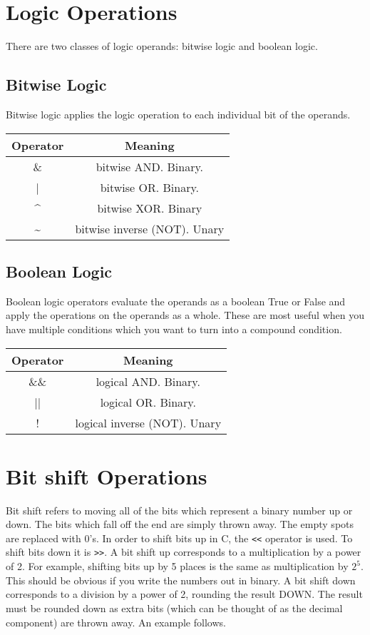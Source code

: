 \section{Logic Operations}
There are two classes of logic operands: bitwise logic and boolean logic. 
\subsection{Bitwise Logic}
Bitwise logic applies the logic operation to each individual bit of the operands. 
\begin{table}[h!]
\centering
\begin{tabu}{c c}
Operator & Meaning \\
\hline
\& & bitwise AND. Binary. \\
| & bitwise OR. Binary. \\
\textasciicircum & bitwise XOR. Binary\\
\textasciitilde & bitwise inverse (NOT). Unary\\
\end{tabu}
\end{table}

\subsection{Boolean Logic}
Boolean logic operators evaluate the operands as a boolean True or False and apply the operations on the operands as a whole.
These are most useful when you have multiple conditions which you want to turn into a compound condition. 
\begin{table}[h!]
\centering
\begin{tabu}{c c}
Operator & Meaning \\
\hline
\&\& & logical AND. Binary. \\
|| & logical OR. Binary. \\
! & logical inverse (NOT). Unary\\
\end{tabu}
\end{table}

\section{Bit shift Operations}
Bit shift refers to moving all of the bits which represent a binary number up or down. 
The bits which fall off the end are simply thrown away. 
The empty spots are replaced with 0's. 
In order to shift bits up in C, the \verb|<<| operator is used. To shift bits down it is \verb|>>|. 
A bit shift up corresponds to a multiplication by a power of 2. For example, shifting bits up by 5 places is the same as multiplication by $2^5$.
This should be obvious if you write the numbers out in binary.
A bit shift down corresponds to a division by a power of 2, rounding the result DOWN. The result must be rounded down as extra bits (which can be thought of as the decimal component) are thrown away.
An example follows.

